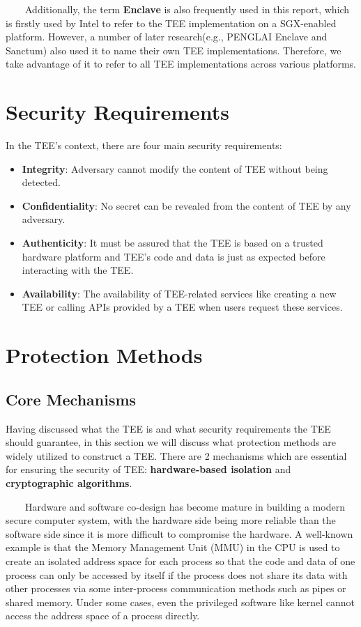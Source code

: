 \documentclass[12pt,twoside]{report}
\begin{document}
\ \ \ \ Additionally, the term \textbf{Enclave} is also frequently used in this report, which is firstly used by Intel\cite{mckeen2013innovative} to refer to the TEE implementation on a SGX-enabled platform. However, a number of later research(e.g., PENGLAI Enclave \cite{feng2021scalable} and Sanctum\cite{costan2016sanctum}) also used it to name their own TEE implementations. Therefore, we take advantage of it to refer to all TEE implementations across various platforms.

\section{Security Requirements}

In the TEE's context, there are four main security requirements:

\begin{itemize}
    \item \textbf{Integrity}: Adversary cannot modify the content of TEE without being detected.
    \item \textbf{Confidentiality}: No secret can be revealed from the content of TEE by any adversary.
    \item \textbf{Authenticity}: It must be assured that the TEE is based on a trusted hardware platform and TEE's code and data is just as expected before interacting with the TEE.
    \item \textbf{Availability}: The availability of TEE-related services like creating a new TEE or calling APIs provided by a TEE when users request these services.
\end{itemize}

\section{Protection Methods}

\subsection{Core Mechanisms}
Having discussed what the TEE is and what security requirements the TEE should guarantee, in this section we will discuss what protection methods are widely utilized to construct a TEE. There are 2 mechanisms which are essential for ensuring the security of TEE: \textbf{hardware-based isolation} and \textbf{cryptographic algorithms}.

\ \ \ \ Hardware and software co-design has become mature in building a modern secure computer system, with the hardware side being more reliable than the software side since it is more difficult to compromise the hardware. A well-known example is that the Memory Management Unit (MMU) in the CPU is used to create an isolated address space for each process so that the code and data of one process can only be accessed by itself if the process does not share its data with other processes via some inter-process communication methods such as pipes or shared memory. Under some cases, even the privileged software like kernel cannot access the address space of a process directly.
\end{document}
